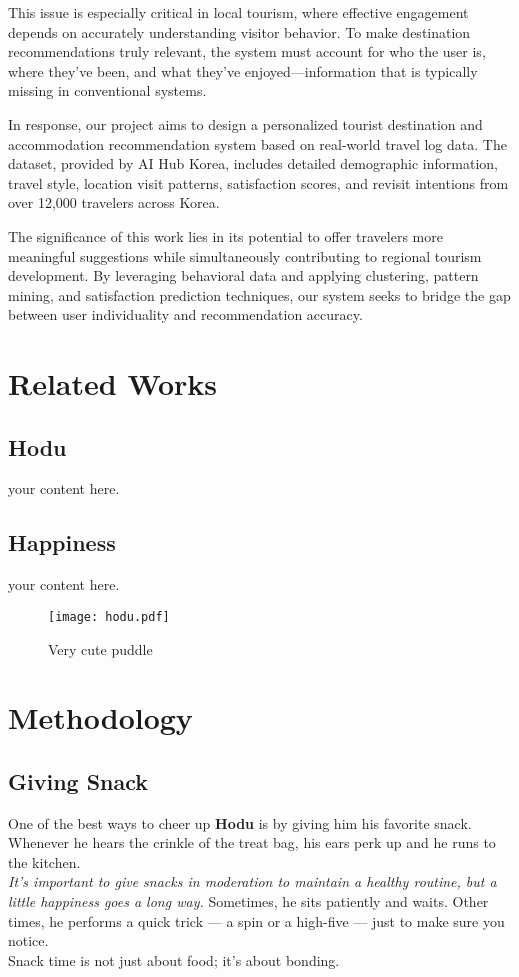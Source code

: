 \documentclass[sigconf]{acmart}
\begin{document}
This issue is especially critical in local tourism, where effective engagement depends on accurately understanding visitor behavior. To make destination recommendations truly relevant, the system must account for who the user is, where they’ve been, and what they’ve enjoyed—information that is typically missing in conventional systems.

In response, our project aims to design a personalized tourist destination and accommodation recommendation system based on real-world travel log data. The dataset, provided by AI Hub Korea, includes detailed demographic information, travel style, location visit patterns, satisfaction scores, and revisit intentions from over 12,000 travelers across Korea.

The significance of this work lies in its potential to offer travelers more meaningful suggestions while simultaneously contributing to regional tourism development. By leveraging behavioral data and applying clustering, pattern mining, and satisfaction prediction techniques, our system seeks to bridge the gap between user individuality and recommendation accuracy.




\section{Related Works}
\subsection{Hodu}
your content here.
\subsection{Happiness}
your content here.
 \begin{figure}[h]
  \centering
  \texttt{[image: hodu.pdf]}
  \caption{Very cute puddle}
  \label{fig:baby puddle}
 \end{figure}

\section{Methodology}
\subsection{Giving Snack}
One of the best ways to cheer up \textbf{Hodu} is by giving him his favorite 
snack. Whenever he hears the crinkle of the treat bag, his ears perk up 
and he runs to the kitchen. \\ \textit{It’s important to give snacks 
in moderation to maintain a healthy routine, but a little happiness goes a 
long way.}
Sometimes, he sits patiently and waits. Other times, he performs a quick trick — a spin or a high-five — just to make 
sure you notice. \\ Snack time is not just about food; it's 
about bonding.
\end{document}
